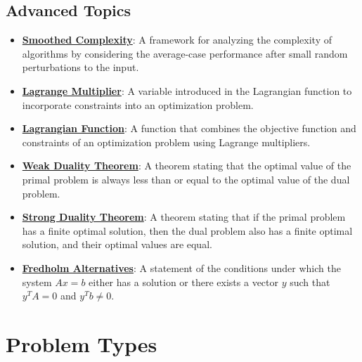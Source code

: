 \documentclass{article}%
\begin{document}
\subsection{Advanced Topics}%
\label{subsec:AdvancedTopics}%
\begin{itemize}[leftmargin=*]%
\item \href{https://www.math.purdue.edu/~yipn/421/2024-09-05-SimplexEfficiency.pdf#page=11}{\textbf{Smoothed Complexity}}: A framework for analyzing the complexity of algorithms by considering the average-case performance after small random perturbations to the input.%
\item \href{https://www.math.purdue.edu/~yipn/421/2024-09-17-DualityGeneral.pdf#page=2}{\textbf{Lagrange Multiplier}}: A variable introduced in the Lagrangian function to incorporate constraints into an optimization problem.%
\item \href{https://www.math.purdue.edu/~yipn/421/2024-09-17-DualityGeneral.pdf#page=2}{\textbf{Lagrangian Function}}: A function that combines the objective function and constraints of an optimization problem using Lagrange multipliers.%
\item \href{https://www.math.purdue.edu/~yipn/421/2024-09-17-DualityGeneral.pdf#page=5}{\textbf{Weak Duality Theorem}}: A theorem stating that the optimal value of the primal problem is always less than or equal to the optimal value of the dual problem.%
\item \href{https://www.math.purdue.edu/~yipn/421/2024-09-17-DualityGeneral.pdf#page=17}{\textbf{Strong Duality Theorem}}: A theorem stating that if the primal problem has a finite optimal solution, then the dual problem also has a finite optimal solution, and their optimal values are equal.%
\item \href{https://www.math.purdue.edu/~yipn/421/2024-10-28-Farkas.pdf#page=3}{\textbf{Fredholm Alternatives}}: A statement of the conditions under which the system $Ax = b$ either has a solution or there exists a vector $y$ such that $y^T A = 0$ and $y^T b \neq 0$.%
\end{itemize}

%
\section{Problem Types}%
\label{sec:ProblemTypes}%
\end{document}
